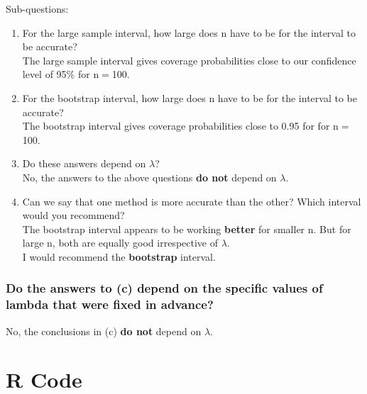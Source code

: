\documentclass[12pt,letterpaper,titlepage,en-US]{article}
\begin{document}
Sub-questions:
\begin{enumerate}
\item For the large sample interval, how large does n have to be for the interval to be accurate?\\
The large sample interval gives coverage probabilities close to our confidence level of 95\% for n$=$100.


\item For the bootstrap interval, how large does n have to be for the interval to be accurate?\\
The bootstrap interval gives coverage probabilities close to 0.95  for for n$=$100.

\item Do these answers depend on $\lambda$?\\
No, the answers to the above questions \textbf{do not} depend on $\lambda$.

\item Can we say that one method is more accurate than the other? Which interval would you recommend?\\
The bootstrap interval appears to be working \textbf{better} for smaller n. But for large n, both are equally good irrespective of $\lambda$. \\
I would recommend the \textbf{bootstrap} interval.

\end{enumerate}



\subsubsection{Do the answers to (c) depend on the specific values of lambda that were fixed in advance?}
No, the conclusions in (c) \textbf{do not} depend on $\lambda$.











\section{R Code}




\end{document}

